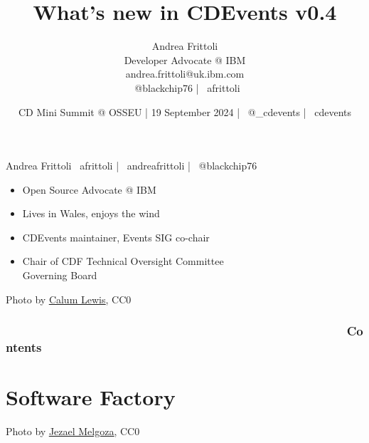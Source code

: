 \documentclass[aspectratio=169,11pt,hyperref={colorlinks=true}]{beamer}
\title{What’s new in CDEvents v0.4}
\date[19 September 2024]{CD Mini Summit @ OSSEU | 19 September 2024 | \faTwitter ~@\_cdevents | \faGithub ~cdevents}
\author[Andrea Frittoli]{%
  Andrea Frittoli \\
  Developer Advocate @ IBM\\
  andrea.frittoli@uk.ibm.com \\
  \faTwitter ~@blackchip76 | \faGithub ~afrittoli\\
}
\begin{document}
\begin{frame}
\titlepage{}
\end{frame}

\begin{speakerframe}{Andrea Frittoli}%
  {%
  \faGithub ~afrittoli | \faLinkedin ~andreafrittoli | \faTwitter ~@blackchip76
  }%
  {%
  \begin{itemize}
    \item{Open Source Advocate @ IBM}
    \item{Lives in Wales, enjoys the wind}
    \item{CDEvents maintainer, Events SIG co-chair}
    \item{Chair of CDF Technical Oversight Committee \\ Governing Board}
  \end{itemize}
  }%
\end{speakerframe}

\begin{lpicrblack}{%
  Photo by \href{https://unsplash.com/@calumlewis}{\underline{Calum Lewis}}, CC0
  }%
  {%
  \tableofcontents
  }%
  {}
  \frametitle{~~~~~~~~~~~~~~~~~~~~~~~~~~~~~~~~~~~~~~~~~~~~~~~~~~~Contents}
\end{lpicrblack}

\section[Software Factory]{Software Factory}

\begin{sectionwithpiclargecentral}{Photo by \href{https://unsplash.com/@jezar}{\underline{Jezael Melgoza}}, CC0}
\end{sectionwithpiclargecentral}
\end{document}
